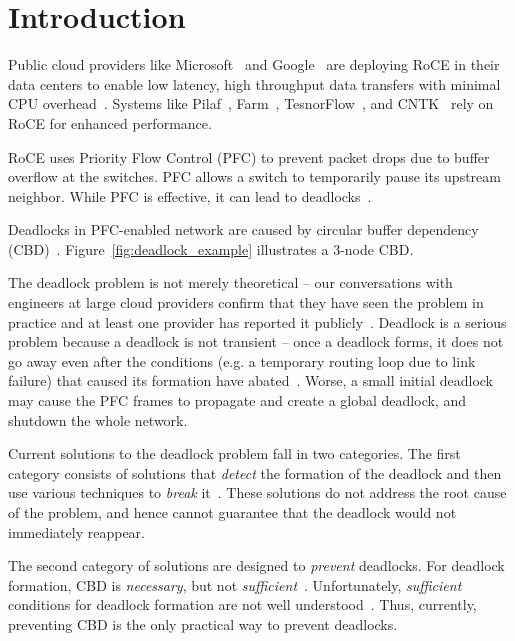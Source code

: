 \section{Introduction}
\label{sec:intro}

Public cloud providers like Microsoft~\cite{dcqcn} and Google~\cite{timely} are
deploying RoCE in their data centers to enable low latency, high throughput data
transfers with minimal CPU overhead~\cite{dcqcn}. Systems like
Pilaf~\cite{pilaf}, Farm~\cite{farm}, TesnorFlow~\cite{tensorflow}, and
CNTK~\cite{cntk} rely on RoCE for enhanced performance.

RoCE uses Priority Flow Control (PFC) to prevent packet drops due to buffer
overflow at the switches. PFC allows a switch to temporarily pause its upstream
neighbor. While PFC is effective, it can lead to
deadlocks~\cite{rdmaatscale,tcpbolt,hu2016deadlocks}.

Deadlocks in PFC-enabled network are caused by circular buffer dependency
(CBD)~\cite{hu2016deadlocks}. Figure~\ref{fig:deadlock_example} illustrates a
3-node CBD.

The deadlock problem is not merely theoretical -- our conversations with
engineers at large cloud providers confirm that they have seen the problem in
practice and at least one provider has reported it publicly~\cite{rdmaatscale}.
Deadlock is a serious problem because a deadlock is not transient -- once a
deadlock forms, it does not go away even after the conditions (e.g. a temporary
routing loop due to link failure) that caused its formation have
abated~\cite{rdmaatscale}. Worse, a small initial deadlock may cause the PFC
frames to propagate and create a global deadlock, and shutdown the whole
network.

Current solutions to the deadlock problem fall in two categories. The first
category consists of solutions that {\em detect} the formation of the deadlock
and then use various techniques to {\em break} it~\cite{shpiner2016unlocking}.
These solutions do not address the root cause of the problem, and hence cannot
guarantee that the deadlock would not immediately reappear.

The second category of solutions are designed to {\em prevent} deadlocks.  For
deadlock formation, CBD is {\em necessary}, but not {\em
sufficient}~\cite{hu2016deadlocks}. Unfortunately, {\em sufficient} conditions
for deadlock formation are not well understood~\cite{hu2016deadlocks}. Thus,
currently, preventing CBD is the only practical way to prevent deadlocks.

